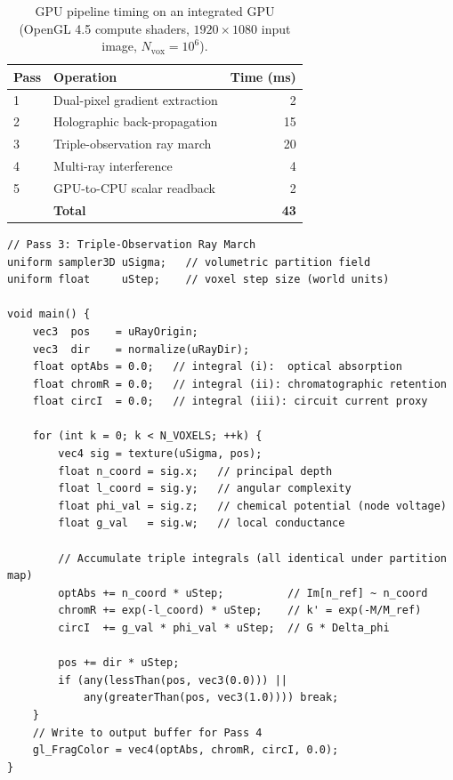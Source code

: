 \begin{table}[!htbp]
\centering
\caption{GPU pipeline timing on an integrated GPU (OpenGL 4.5 compute
shaders, $1920\times1080$ input image, $N_{\mathrm{vox}} = 10^6$).}
\label{tab:gpu-timing}
\begin{tabular}{@{}llr@{}}
\toprule
Pass & Operation & Time (ms) \\
\midrule
1 & Dual-pixel gradient extraction  &  2 \\
2 & Holographic back-propagation    & 15 \\
3 & Triple-observation ray march    & 20 \\
4 & Multi-ray interference          &  4 \\
5 & GPU-to-CPU scalar readback      &  2 \\
\midrule
  & \textbf{Total}                  & \textbf{43} \\
\bottomrule
\end{tabular}
\end{table}

\begin{lstlisting}[style=glsl, caption={Pass~3 ray-march shader (excerpt).
Each invocation processes one ray; the three integrals are accumulated
per step.}, label=lst:ray-march]
// Pass 3: Triple-Observation Ray March
uniform sampler3D uSigma;   // volumetric partition field
uniform float     uStep;    // voxel step size (world units)

void main() {
    vec3  pos    = uRayOrigin;
    vec3  dir    = normalize(uRayDir);
    float optAbs = 0.0;   // integral (i):  optical absorption
    float chromR = 0.0;   // integral (ii): chromatographic retention
    float circI  = 0.0;   // integral (iii): circuit current proxy

    for (int k = 0; k < N_VOXELS; ++k) {
        vec4 sig = texture(uSigma, pos);
        float n_coord = sig.x;   // principal depth
        float l_coord = sig.y;   // angular complexity
        float phi_val = sig.z;   // chemical potential (node voltage)
        float g_val   = sig.w;   // local conductance

        // Accumulate triple integrals (all identical under partition map)
        optAbs += n_coord * uStep;          // Im[n_ref] ~ n_coord
        chromR += exp(-l_coord) * uStep;    // k' = exp(-M/M_ref)
        circI  += g_val * phi_val * uStep;  // G * Delta_phi

        pos += dir * uStep;
        if (any(lessThan(pos, vec3(0.0))) ||
            any(greaterThan(pos, vec3(1.0)))) break;
    }
    // Write to output buffer for Pass 4
    gl_FragColor = vec4(optAbs, chromR, circI, 0.0);
}
\end{lstlisting}

